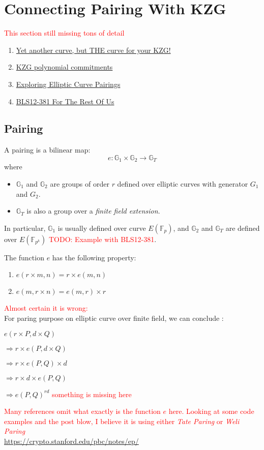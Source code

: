 \documentclass[10pt]{article}
\newcommand{\FField}{\mathbb{F}_p}
\newcommand{\HL}[1]{\textcolor{red}{#1}}
\begin{document}
\section{Connecting Pairing With KZG}
\HL{This section still missing tons of detail}
\begin{enumerate}
    \item \href{https://hackmd.io/@gnark/kzg-bls24}{Yet another curve, but THE
            curve for your KZG!}
    \item
            \href{https://dankradfeist.de/ethereum/2020/06/16/kate-polynomial-commitments.html}{KZG
            polynomial commitments}
        \item \href{https://vitalik.ca/general/2017/01/14/exploring_ecp.html}{Exploring Elliptic Curve Pairings }
        \item \href{https://hackmd.io/@benjaminion/bls12-381}{BLS12-381 For The Rest Of Us}
\end{enumerate}

\subsection{Pairing}
A pairing is a bilinear map:
\[
    e: \mathbb{G}_1 \times \mathbb{G}_2 \rightarrow \mathbb{G}_T
\]
where
\begin{itemize}
    \item $\mathbb{G}_1$ and $\mathbb{G}_2$ are groups of order $r$ defined
        over elliptic curves with generator $G_1$ and $G_2$. 
    \item $\mathbb{G}_T$ is also a group over a \emph{finite field extension}.
\end{itemize}
In particular, $\mathbb{G}_1$ is usually defined over curve $E(\FField)$, and
$\mathbb{G}_2$ and $\mathbb{G}_T$ are defined over $E(\mathbb{F}_{p^k})$
\HL{TODO: Example with BLS12-381}.

The function $e$ has the following property:
\begin{enumerate}
    \item $e(r \times m, n) = r \times e(m, n)$
    \item $e(m, r \times n) = e(m, r) \times r$
\end{enumerate}

\HL{Almost certain it is wrong:}\\
For paring purpose on elliptic curve over finite field, we can conclude :
\begin{description}
    \item $e(r \times P, d \times Q)$
    \item $\Longrightarrow r \times e(P, d \times Q)$
    \item $\Longrightarrow r \times e(P, Q) \times d$
    \item $\Longrightarrow r \times d \times e(P, Q)$
    \item $\Longrightarrow e(P, Q)^{rd}$ \HL{something is missing here}
\end{description}
\HL{Many references omit what exactly is the function $e$ here. Looking at
some code examples and the post blow, I believe it is using either \emph{Tate Paring} or \emph{Weli Paring}}\\
\href{References}{https://crypto.stanford.edu/pbc/notes/ep/}
\end{document}
